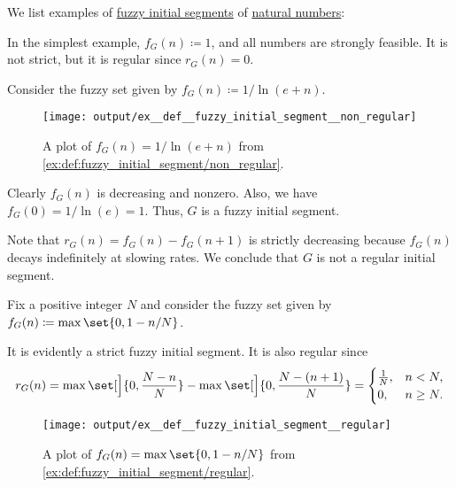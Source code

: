 \begin{example}\label{ex:def:fuzzy_initial_segment}
  We list examples of \hyperref[def:fuzzy_initial_segment]{fuzzy initial segments} of \hyperref[def:natural_numbers]{natural numbers}:
  \begin{thmenum}
     In the simplest example, \( f_G(n) \coloneqq 1 \), and all numbers are strongly feasible. It is not strict, but it is regular since \( r_G(n) = 0 \).

     Consider the fuzzy set given by \( f_G(n) \coloneqq 1 / \ln(e + n) \).

    \begin{figure}[!ht]
      \centering
      \texttt{[image: output/ex\_\_def\_\_fuzzy\_initial\_segment\_\_non\_regular]}
      \caption{A plot of \( f_G(n) = 1 / \ln(e + n) \) from \cref{ex:def:fuzzy_initial_segment/non_regular}.}\label{fig:ex:def:fuzzy_initial_segment/non_regular}
    \end{figure}

    Clearly \( f_G(n) \) is decreasing and nonzero. Also, we have \( f_G(0) = 1 / \ln(e) = 1 \). Thus, \( G \) is a fuzzy initial segment.

    Note that \( r_G(n) = f_G(n) - f_G(n + 1) \) is strictly decreasing because \( f_G(n) \) decays indefinitely at slowing rates. We conclude that \( G \) is not a regular initial segment.

     Fix a positive integer \( N \) and consider the fuzzy set given by \( f_G(n) \coloneqq \max\set{ 0, 1 - n / N } \).

    It is evidently a strict fuzzy initial segment. It is also regular since
    \begin{equation*}
      r_G(n)
      =
      \max\set[\Big]{ 0, \frac {N - n} N } - \max\set[\Big]{ 0, \frac {N - (n + 1)} N }
      =
      \begin{cases}
        \frac 1 N, &n < N, \\
        0,         &n \geq N.
      \end{cases}
    \end{equation*}

    \begin{figure}[!ht]
      \centering
      \texttt{[image: output/ex\_\_def\_\_fuzzy\_initial\_segment\_\_regular]}
      \caption{A plot of \( f_G(n) = \max\set{ 0, 1 - n / N } \) from \cref{ex:def:fuzzy_initial_segment/regular}.}\label{fig:ex:def:fuzzy_initial_segment/regular}
    \end{figure}
  \end{thmenum}
\end{example}
